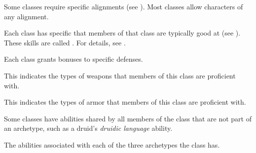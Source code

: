     Some classes require specific alignments (see ).
    Most classes allow characters of any alignment.

    Each class has specific  that members of that class are typically good at (see ).
    These skills are called .
    For details, see .

    Each class grants bonuses to specific defenses.

    This indicates the types of weapons that members of this class are proficient with.

    This indicates the types of armor that members of this class are proficient with.

    Some classes have abilities shared by all members of the class that are not part of an archetype, such as a druid's \textit{druidic language} ability.

    The abilities associated with each of the three archetypes the class has.


